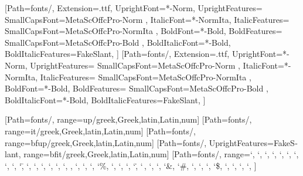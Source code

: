 
\usepackage[mathrm=sym, mathit=sym, mathsf=sym, mathbf=sym]{unicode-math}
\setmainfont{MetaOffcPro}[Path=fonts/,
	Extension=.ttf,
	UprightFont=*-Norm,
	UprightFeatures={
		SmallCapsFont={MetaScOffcPro-Norm}
	},
	ItalicFont=*-NormIta,
	ItalicFeatures={
		SmallCapsFont={MetaScOffcPro-NormIta}
	},
	BoldFont=*-Bold,
	BoldFeatures={
		SmallCapsFont={MetaScOffcPro-Bold}
	},
	BoldItalicFont=*-Bold,
	BoldItalicFeatures={FakeSlant},
]
\setsansfont{MetaOffcPro}[Path=fonts/,
	Extension=.ttf,
	UprightFont=*-Norm,
	UprightFeatures={
		SmallCapsFont={MetaScOffcPro-Norm}
	},
	ItalicFont=*-NormIta,
	ItalicFeatures={
		SmallCapsFont={MetaScOffcPro-NormIta}
	},
	BoldFont=*-Bold,
	BoldFeatures={
		SmallCapsFont={MetaScOffcPro-Bold}
	},
	BoldItalicFont=*-Bold,
	BoldItalicFeatures={FakeSlant},
]

[Path=fonts/,
	range=up/{greek,Greek,latin,Latin,num}]
[Path=fonts/,
	range=it/{greek,Greek,latin,Latin,num}]
[Path=fonts/,
	range=bfup/{greek,Greek,latin,Latin,num}]
[Path=fonts/, UprightFeatures={FakeSlant},
	range=bfit/{greek,Greek,latin,Latin,num}]
[Path=fonts/,
	range={`\+, `\-, `\×, `\÷, `\⋅, `\*, `\/, `\⁄, `\±,
		`\=, `\≠, `\≈, `\<, `\>, `\≤, `\≥, \partial, `\∞, `\†, `\‡,
		`\%, `\‰, `\!, `\?, `\., `\,, `\:, `\;, `\&, `\#, `\@,
		`\§, `\€, `\$, `\£, `\¥, `\©, `\®,
	}
]

\usepackage{polyglossia}
\setmainlanguage{german}

\usepackage[pantone312]{wwustyle}
\usepackage{selnolig}
\usepackage{microtype}


